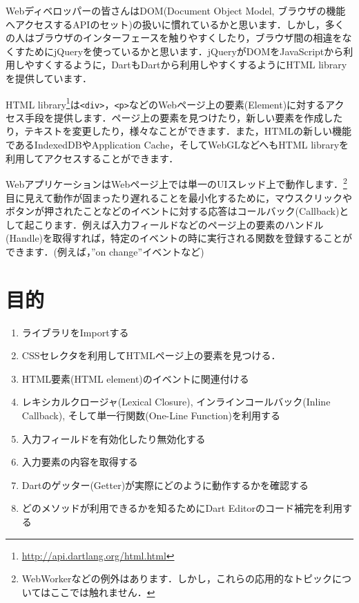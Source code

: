 
Webディベロッパーの皆さんはDOM(Document Object Model, ブラウザの機能へアクセスするAPIのセット)の扱いに慣れているかと思います．しかし，多くの人はブラウザのインターフェースを触りやすくしたり，ブラウザ間の相違をなくすためにjQueryを使っているかと思います．jQueryがDOMをJavaScriptから利用しやすくするように，DartもDartから利用しやすくするようにHTML libraryを提供しています．

HTML library\footnote{\url{http://api.dartlang.org/html.html}}は\verb|<div>|，\verb|<p>|などのWebページ上の要素(Element)に対するアクセス手段を提供します．ページ上の要素を見つけたり，新しい要素を作成したり，テキストを変更したり，様々なことができます．また，HTMLの新しい機能であるIndexedDBやApplication Cache，そしてWebGLなどへもHTML libraryを利用してアクセスすることができます．

WebアプリケーションはWebページ上では単一のUIスレッド上で動作します．\footnote{WebWorkerなどの例外はあります．しかし，これらの応用的なトピックについてはここでは触れません．}目に見えて動作が固まったり遅れることを最小化するために，マウスクリックやボタンが押されたことなどのイベントに対する応答はコールバック(Callback)として起こります．例えば入力フィールドなどのページ上の要素のハンドル(Handle)を取得すれば，特定のイベントの時に実行される関数を登録することができます．(例えば，''on change''イベントなど)

\section{目的}

\begin{enumerate}
\item ライブラリをImportする
\item CSSセレクタを利用してHTMLページ上の要素を見つける．
\item HTML要素(HTML element)のイベントに関連付ける
\item レキシカルクロージャ(Lexical Closure), インラインコールバック(Inline Callback), そして単一行関数(One-Line Function)を利用する
\item 入力フィールドを有効化したり無効化する
\item 入力要素の内容を取得する
\item Dartのゲッター(Getter)が実際にどのように動作するかを確認する
\item どのメソッドが利用できるかを知るためにDart Editorのコード補完を利用する
\end{enumerate}

